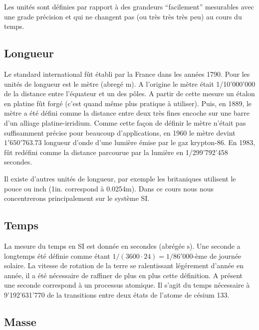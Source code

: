 \documentclass[a4paper,12pt]{book}
\newcommand{\m}{\mathrm{m}}
\newcommand{\s}{\mathrm{s}}
\begin{document}
Les unités sont définies par rapport à des grandeurs ``facilement'' mesurables avec une grade précision et qui ne changent pas (ou très très très peu)
au cours du temps.

\subsection{Longueur}

Le standard international fût établi par la France dans les années 1790. 
Pour les unités de longueur est le mètre (abregé $\m$). A l'origine le mètre était 1/10'000'000 de la distance entre l'équateur et un des pôles.
A partir de cette mesure un étalon en platine fût forgé (c'est quand même plus pratique à utiliser). Puis, en 1889, le mètre a été défini comme la distance entre deux très fines encoche sur une barre d'un alliage platine-irridium. Comme cette façon de définir le mètre n'était pas suffisamment précise pour beaucoup d'applications, en 1960
le mètre devint $1'650'763.73$ longueur d'onde d'une lumière émise par le gaz krypton-86. En 1983, fût redéfini comme la distance parcourue par la lumière en 1/299'792'458 secondes.

Il existe d'autres unités de longueur, par exemple les britaniques utilisent le pouce  ou inch (1$\mathrm{in.}$ correspond à 0.0254$\m$). Dans ce cours nous nous concentrerons principalement
sur le système SI.

\subsection{Temps}

La mesure du temps en SI est donnée en secondes (abrégée $\s$). Une seconde a longtemps été définie comme étant $1/(3600\cdot 24)=1/86'000$-ème
de journée solaire. La vitesse de rotation de la terre se ralentissant légérement d'année en année, il a été nécessaire de raffiner de plus en plus 
cette définition. A présent une seconde correspond à un processus atomique. Il s'agit du temps nécessaire à 9'192'631'770 de 
la transitions entre deux états de l'atome de césium 133. 

\subsection{Masse}
\end{document}
